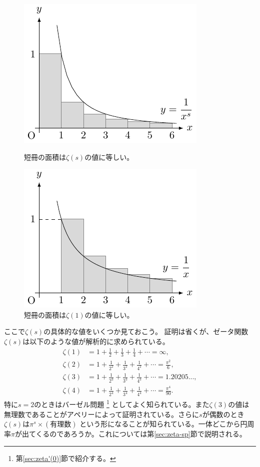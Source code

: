 \documentclass[11pt,b5paper,papersize,dvipdfmx]{jsbook}
\begin{document}
\begin{figure}[H]
  \begin{minipage}{0.49\hsize}
    \centering
    \includegraphics[]{nkym/fig/x-s}
    \caption{短冊の面積は$\zeta(s)$の値に等しい。}
    \label{fig:zeta(s)}
  \end{minipage}
  \begin{minipage}{0.49\hsize}
    \centering
    \includegraphics[]{nkym/fig/x-1}
    \caption{短冊の面積は$\zeta(1)$の値に等しい。}
    \label{fig:zeta(1)}
  \end{minipage}
\end{figure}
%
ここで$\zeta(s)$の具体的な値をいくつか見ておこう。
証明は省くが、ゼータ関数$\zeta(s)$は以下のような値が解析的に求められている。
  \begin{align*}
    \zeta(1) &= 1 + \frac{1}{2} + \frac{1}{3} + \frac{1}{4} + \cdots = \infty, \\
    \zeta(2) &= 1 + \frac{1}{2^2} + \frac{1}{3^2} + \frac{1}{4^2} + \cdots = \frac{\pi^2}{6}, \\
    \zeta(3) &= 1 + \frac{1}{2^3} + \frac{1}{3^3} + \frac{1}{4^3} + \cdots = 1.20205...,\\
    \zeta(4) &= 1 + \frac{1}{2^4} + \frac{1}{3^4} + \frac{1}{4^4} + \cdots = \frac{\pi^4}{90}.
  \end{align*}
特に$s=2$のときはバーゼル問題
  \footnote{第\ref{sec:zeta'(0)}節で紹介する。}
としてよく知られている。また$\zeta(3)$の値は無理数であることがアペリーによって証明されている。さらに$s$が偶数のとき$\zeta(s)$は$\pi^s \times (有理数)$ という形になることが知られている。一体どこから円周率$\pi$が出てくるのであろうか。これについては第\ref{sec:zeta-sp}節で説明される。
\end{document}
